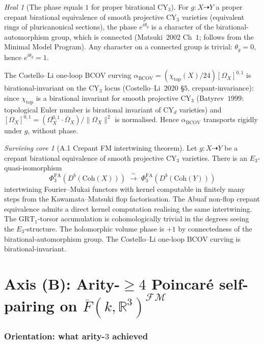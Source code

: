 \documentclass[11pt]{article}
\theoremstyle{definition}
\theoremstyle{remark}
\newtheorem{heal}[theorem]{Heal}
\newtheorem{survivor}[theorem]{Surviving core}
\providecommand{\FMbar}{\overline{F}}
\providecommand{\FM}{\mathcal{FM}}
\providecommand{\PhiFA}{\Phi^{\mathrm{FA}}}
\providecommand{\Coh}{\mathrm{Coh}}
\providecommand{\FM}{\mathrm{FM}}
\providecommand{\RR}{\mathbb{R}}
\providecommand{\GRT}{\mathrm{GRT}}
\begin{document}
\begin{heal}[The phase equals $1$ for proper birational CY$_3$]
\label{heal:a-cycle-5}
For $g \colon X \dashrightarrow Y$ a proper crepant birational
equivalence of smooth projective CY$_3$ varieties (equivalent rings
of pluricanonical sections), the phase $e^{i\theta_g}$ is a character
of the birational-automorphism group, which is connected (Matsuki~$2002$
Ch~$1$; follows from the Minimal Model Program). Any character on a
connected group is trivial: $\theta_g = 0$, hence $e^{i\theta_g} = 1$.

The Costello--Li one-loop BCOV curving
$\alpha_{\mathrm{BCOV}} = (\chi_{\mathrm{top}}(X)/24)[\Omega_X]^{0,1}$
is birational-invariant on the CY$_3$ locus (Costello--Li~$2020$
\S$5$, crepant-invariance): since $\chi_{\mathrm{top}}$ is a
birational invariant for smooth projective CY$_3$
(Batyrev~$1999$: topological Euler number is birational invariant of
CY$_d$ varieties) and $[\Omega_X]^{0,1} = (\Omega_X^{0,1} \cdot
\bar\Omega_X) / \|\Omega_X\|^2$ is normalised. Hence
$\alpha_{\mathrm{BCOV}}$ transports rigidly under $g$, without phase.
\end{heal}

\begin{survivor}[A.1 Crepant FM intertwining theorem]
\label{surv:a-crepant-fm}
Let $g \colon X \dashrightarrow Y$ be a crepant birational equivalence
of smooth projective CY$_3$ varieties. There is an $E_3$-quasi-isomorphism
\[
 \PhiFA_3(D^b(\Coh(X))) \;\xrightarrow{\ \sim\ }\; \PhiFA_3(D^b(\Coh(Y)))
\]
intertwining Fourier--Mukai functors with kernel computable in finitely
many steps from the Kawamata--Matsuki flop factorisation. The
Abuaf non-flop crepant equivalence admits a direct kernel computation
realising the same intertwining. The $\GRT_1$-torsor accumulation is
cohomologically trivial in the degrees seeing the $E_3$-structure.
The holomorphic volume phase is $+1$ by connectedness of the
birational-automorphism group. The Costello--Li one-loop BCOV curving
is birational-invariant.
\end{survivor}

\part*{Axis (B): Arity-$\geq 4$ Poincar\'e self-pairing on $\FMbar(k,\RR^3)^{\FM}$}

\section{Orientation: what arity-$3$ achieved}
\end{document}
